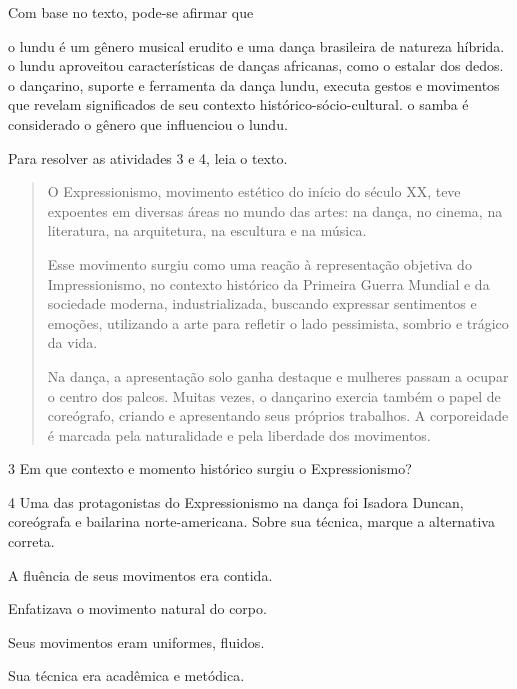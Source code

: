 Com base no texto, pode-se afirmar que

\begin{boxlist}
  o lundu é um gênero musical erudito e uma dança brasileira de
  natureza híbrida.
  o lundu aproveitou características de danças africanas, como o estalar
  dos dedos.
  o dançarino, suporte e ferramenta da dança lundu, executa gestos e
  movimentos que revelam significados de seu contexto
  histórico-sócio-cultural.
  o samba é considerado o gênero que influenciou o lundu.
\end{boxlist}

Para resolver as atividades 3 e 4, leia o texto.

\begin{quote}
O Expressionismo, movimento estético do início do século XX, teve
expoentes em diversas áreas no mundo das artes: na dança, no cinema, na
literatura, na arquitetura, na escultura e na música.

Esse movimento surgiu como uma reação à representação objetiva do
Impressionismo, no contexto histórico da Primeira Guerra Mundial e da
sociedade moderna, industrializada, buscando expressar sentimentos e
emoções, utilizando a arte para refletir o lado pessimista, sombrio e
trágico da vida.

Na dança, a apresentação solo ganha destaque e mulheres passam a ocupar
o centro dos palcos. Muitas vezes, o dançarino exercia também o papel de
coreógrafo, criando e apresentando seus próprios trabalhos. A
corporeidade é marcada pela naturalidade e pela liberdade dos movimentos.

\end{quote}

\num{3} Em que contexto e momento histórico surgiu o Expressionismo?


\num{4} Uma das protagonistas do Expressionismo na dança foi Isadora Duncan,
coreógrafa e bailarina norte-americana. Sobre sua técnica, marque a
alternativa correta.

\begin{boxlist}
 A fluência de seus movimentos era contida.

 Enfatizava o movimento natural do corpo.

 Seus movimentos eram uniformes, fluidos.

 Sua técnica era acadêmica e metódica.
\end{boxlist}


